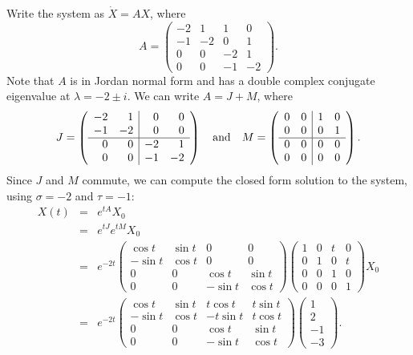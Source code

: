 \documentclass{ximera}
\begin{document}
\soln Write the system as $\dot{X} = AX$, where
\[
A =
\left(\begin{array}{rrrr}
-2 & 1 & 1 & 0 \\
-1 & -2 & 0 & 1 \\
0 & 0 & -2 & 1 \\
0 & 0 & -1 & -2
\end{array}\right).
\]
Note that $A$ is in Jordan normal form and has a double complex conjugate
eigenvalue at $\lambda = -2 \pm i$.  We can write $A = J + M$, where
\[
J = 
\left(\begin{array}{rr|rr}
-2 & 1 & 0 & 0 \\
-1 & -2 & 0 & 0 \\
\hline
0 & 0 & -2 & 1 \\
0 & 0 & -1 & -2
\end{array}\right) \quad\mbox{and}\quad
M =
\left(\begin{array}{rr|rr}
0 & 0 & 1 & 0 \\
0 & 0 & 0 & 1 \\
\hline
0 & 0 & 0 & 0 \\
0 & 0 & 0 & 0
\end{array}\right).
\]
Since $J$ and $M$ commute, we can compute the closed form solution to the
system, using $\sigma = -2$ and $\tau = -1$:
\[
\begin{array}{rcl}
X(t) & = & e^{tA}X_0 \\
& = & e^{tJ}e^{tM}X_0 \\
& = & e^{-2t}\left(\begin{array}{rr|rr}
\cos t & \sin t & 0 & 0 \\
-\sin t & \cos t & 0 & 0 \\
\hline
0 & 0 & \cos t & \sin t \\
0 & 0 & -\sin t & \cos t
\end{array}\right)
\left(\begin{array}{rr|rr}
1 & 0 & t & 0 \\
0 & 1 & 0 & t \\
\hline
0 & 0 & 1 & 0 \\
0 & 0 & 0 & 1
\end{array}\right)X_0 \\
& = & e^{-2t}
\left(\begin{array}{rr|rr}
\cos t & \sin t & t\cos t & t\sin t \\
-\sin t & \cos t & -t\sin t & t\cos t \\
\hline
0 & 0 & \cos t & \sin t \\
0 & 0 & -\sin t & \cos t
\end{array}\right)
\left(\begin{array}{r} 1 \\ 2 \\ -1 \\ -3 \end{array}\right).
\end{array}
\]
\end{document}
